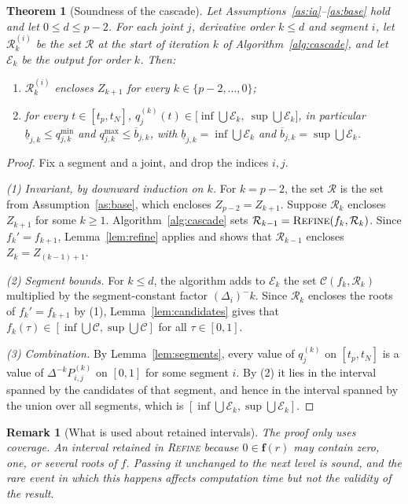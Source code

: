 \documentclass[final,5p,times,twocolumn]{elsarticle}
\newtheorem{theorem}{Theorem}
\newtheorem{remark}{Remark}
\theoremstyle{definition}
\newcommand{\iv}[1]{\mathbf{#1}}
\begin{document}
\begin{theorem}[Soundness of the cascade]\label{thm:soundness}
Let Assumptions~\ref{as:ia}--\ref{as:base} hold and let $0\le d\le p-2$. For each joint $j$, derivative order $k\le d$ and segment $i$, let $\mathcal{R}^{(i)}_k$ be the set $\mathcal{R}$ at the start of iteration $k$ of Algorithm~\ref{alg:cascade}, and let $\mathcal{E}_k$ be the output for order $k$. Then:
\begin{enumerate}
  \item $\mathcal{R}^{(i)}_k$ encloses $Z_{k+1}$ for every $k\in\{p-2,\dots,0\}$;
  \item for every $t\in[t_p,t_N]$, $q_j^{(k)}(t)\in\big[\inf\bigcup\mathcal{E}_k,\ \sup\bigcup\mathcal{E}_k\big]$, in particular $\underline{b}_{j,k}\le q_{j,k}^{\min}$ and $q_{j,k}^{\max}\le\overline{b}_{j,k}$, with $\underline{b}_{j,k}=\inf\bigcup\mathcal{E}_k$ and $\overline{b}_{j,k}=\sup\bigcup\mathcal{E}_k$.
\end{enumerate}
\end{theorem}
\begin{proof}
Fix a segment and a joint, and drop the indices $i,j$.

\emph{(1) Invariant, by downward induction on $k$.} For $k=p-2$, the set $\mathcal{R}$ is the set from Assumption~\ref{as:base}, which encloses $Z_{p-2}=Z_{k+1}$. Suppose $\mathcal{R}_k$ encloses $Z_{k+1}$ for some $k\ge1$. Algorithm~\ref{alg:cascade} sets $\mathcal{R}_{k-1}=\textsc{Refine}(f_k,\mathcal{R}_k)$. Since $f_k'=f_{k+1}$, Lemma~\ref{lem:refine} applies and shows that $\mathcal{R}_{k-1}$ encloses $Z_k=Z_{(k-1)+1}$.

\emph{(2) Segment bounds.} For $k\le d$, the algorithm adds to $\mathcal{E}_k$ the set $\mathcal{C}(f_k,\mathcal{R}_k)$ multiplied by the segment-constant factor $(\Delta_i)^-k$. Since $\mathcal{R}_k$ encloses the roots of $f_k'=f_{k+1}$ by (1), Lemma~\ref{lem:candidates} gives that $f_k(\tau)\in[\inf\bigcup\mathcal{C},\sup\bigcup\mathcal{C}]$ for all $\tau\in[0,1]$.

\emph{(3) Combination.} By Lemma~\ref{lem:segments}, every value of $q_j^{(k)}$ on $[t_p,t_N]$ is a value of $\Delta^{-k}P_{i,j}^{(k)}$ on $[0,1]$ for some segment $i$. By (2) it lies in the interval spanned by the candidates of that segment, and hence in the interval spanned by the union over all segments, which is $[\inf\bigcup\mathcal{E}_k,\sup\bigcup\mathcal{E}_k]$.
\end{proof}

\begin{remark}[What is used about retained intervals]
The proof only uses coverage. An interval retained in \textsc{Refine} because $0\in\iv{f}(r)$ may contain zero, one, or several roots of $f$. Passing it unchanged to the next level is sound, and the rare event in which this happens affects computation time but not the validity of the result.
\end{remark}
\end{document}
